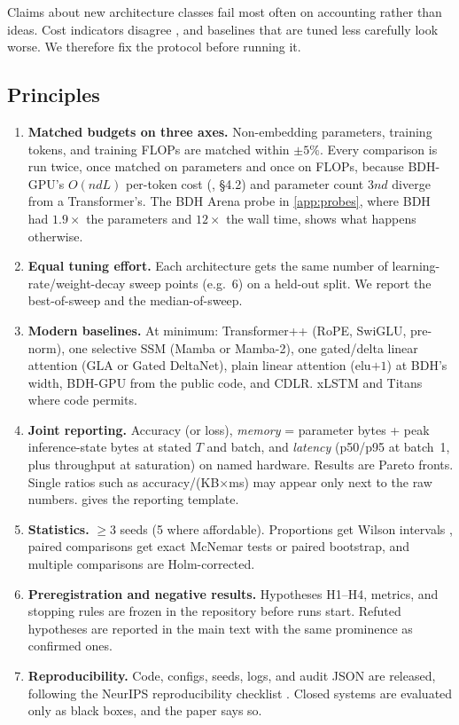\documentclass[11pt]{article}
\theoremstyle{remark}
\newcommand{\cdlr}{\textsc{CDLR}}
\begin{document}
Claims about new architecture classes fail most often on accounting rather than ideas. Cost indicators disagree
\citep{dehghani2022efficiency}, and baselines that are tuned less carefully look worse. We therefore fix the
protocol before running it.

\subsection{Principles}
\begin{enumerate}[label=\textbf{P\arabic*.},leftmargin=*,itemsep=1pt]
\item \textbf{Matched budgets on three axes.} Non-embedding parameters, training tokens, and training FLOPs are
matched within $\pm5\%$. Every comparison is run twice, once matched on parameters and once on FLOPs, because
BDH-GPU's $O(ndL)$ per-token cost (\citealp{kosowski2025bdh}, \S4.2) and parameter count $3nd$ diverge
from a Transformer's. The BDH Arena probe in \cref{app:probes}, where BDH had $1.9\times$ the parameters and
$12\times$ the wall time, shows what happens otherwise.
\item \textbf{Equal tuning effort.} Each architecture gets the same number of learning-rate/weight-decay sweep
points (e.g.\ 6) on a held-out split. We report the best-of-sweep and the median-of-sweep.
\item \textbf{Modern baselines.} At minimum: Transformer++ (RoPE, SwiGLU, pre-norm), one selective SSM (Mamba or
Mamba-2), one gated/delta linear attention (GLA or Gated DeltaNet), plain linear attention (elu$+1$) at BDH's
width, BDH-GPU from the public code, and \cdlr. xLSTM and Titans where code permits.
\item \textbf{Joint reporting.} Accuracy (or loss), \emph{memory} = parameter bytes + peak inference-state bytes at
stated $T$ and batch, and \emph{latency} (p50/p95 at batch~1, plus throughput at saturation) on named hardware.
Results are Pareto fronts. Single ratios such as accuracy/(KB$\times$ms) may appear only next to the raw numbers.  gives the reporting template.


\item \textbf{Statistics.} $\ge3$ seeds (5 where affordable). Proportions get Wilson intervals
\citep{wilson1927probable}, paired comparisons get exact McNemar tests \citep{mcnemar1947note} or paired bootstrap,
and multiple comparisons are Holm-corrected.
\item \textbf{Preregistration and negative results.} Hypotheses H1--H4, metrics, and stopping rules are frozen in
the repository before runs start. Refuted hypotheses are reported in the main text with the same prominence as
confirmed ones.
\item \textbf{Reproducibility.} Code, configs, seeds, logs, and audit JSON are released, following the NeurIPS
reproducibility checklist \citep{pineau2021reproducibility}. Closed systems are evaluated only as black boxes, and
the paper says so.
\end{enumerate}
\end{document}
